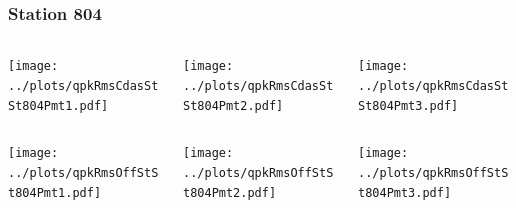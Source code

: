 \documentclass[aspectratio=169]{beamer}
\begin{document}
\begin{frame} 
  \frametitle{Station 804}
  \begin{center}
    \begin{columns}
      \begin{column}{0.33\textwidth}
        \texttt{[image: ../plots/qpkRmsCdasStSt804Pmt1.pdf]}
      \end{column}
      \begin{column}{0.33\textwidth}
        \texttt{[image: ../plots/qpkRmsCdasStSt804Pmt2.pdf]}
      \end{column}
      \begin{column}{0.33\textwidth}
        \texttt{[image: ../plots/qpkRmsCdasStSt804Pmt3.pdf]}
      \end{column}
    \end{columns}
  \end{center}

  \begin{center}
    \begin{columns}
      \begin{column}{0.33\textwidth}
        \texttt{[image: ../plots/qpkRmsOffStSt804Pmt1.pdf]}
      \end{column}
      \begin{column}{0.33\textwidth}
        \texttt{[image: ../plots/qpkRmsOffStSt804Pmt2.pdf]}
      \end{column}
      \begin{column}{0.33\textwidth}
        \texttt{[image: ../plots/qpkRmsOffStSt804Pmt3.pdf]}
      \end{column}
    \end{columns}
  \end{center}
\end{frame}
\end{document}
